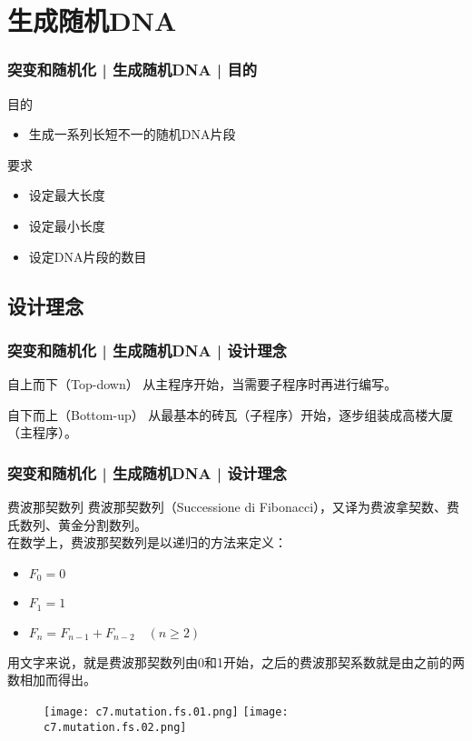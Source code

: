 \section{生成随机DNA}
\begin{frame}
  \frametitle{突变和随机化 | 生成随机DNA | 目的}
  \begin{block}{目的}
    \begin{itemize}
      \item 生成一系列长短不一的随机DNA片段
    \end{itemize}
  \end{block}
  \pause
  \begin{block}{要求}
    \begin{itemize}
      \item 设定最大长度
      \item 设定最小长度
      \item 设定DNA片段的数目
    \end{itemize}
  \end{block}
\end{frame}

\subsection{设计理念}
\begin{frame}
  \frametitle{突变和随机化 | 生成随机DNA | \alert{设计理念}}
  \begin{block}{自上而下（Top-down）}
    从主程序开始，当需要子程序时再进行编写。
  \end{block}
  \pause
  \begin{block}{自下而上（Bottom-up）}
    从最基本的砖瓦（子程序）开始，逐步组装成高楼大厦（主程序）。
  \end{block}
\end{frame}

\begin{frame}
  \frametitle{突变和随机化 | 生成随机DNA | 设计理念}
  \begin{block}{费波那契数列}
    费波那契数列（Successione di Fibonacci），又译为费波拿契数、费氏数列、黄金分割数列。\\
在数学上，费波那契数列是以递归的方法来定义：
\begin{itemize}
  \item $F_{0}=0$
  \item $F_{1}=1$
  \item $F_{n}=F_{{n-1}}+F_{{n-2}}\quad (n\geq 2)$
\end{itemize}
用文字来说，就是费波那契数列由0和1开始，之后的费波那契系数就是由之前的两数相加而得出。
  \end{block}
  \begin{figure}
    \centering
    \texttt{[image: c7.mutation.fs.01.png]}\quad
    \texttt{[image: c7.mutation.fs.02.png]}
  \end{figure}
\end{frame}


